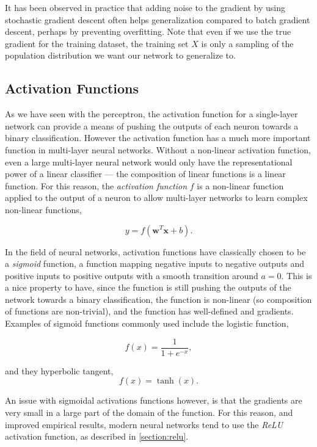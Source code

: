 \documentclass[thesis]{subfiles}
\begin{document}
It has been observed in practice that adding noise to the gradient by using stochastic gradient descent often helps generalization compared to batch gradient descent, perhaps by preventing overfitting. Note that even if we use the true gradient for the training dataset, the training set $X$ is only a sampling of the population distribution we want our network to generalize to.

\subsection{Activation Functions}
As we have seen with the perceptron, the activation function for a single-layer network can provide a means of pushing the outputs of each neuron towards a binary classification. However the activation function has a much more important function in multi-layer neural networks. Without a non-linear activation function, even a large multi-layer neural network would only have the representational power of a linear classifier --- the composition of linear functions is a linear function. For this reason, the \emph{activation function} $f$ is a non-linear function applied to the output of a neuron to allow multi-layer networks to learn complex non-linear functions,

\begin{equation}
y = f\left(\mathbf{w}^T\mathbf{x} + b\right).
\end{equation}

In the field of neural networks, activation functions have classically chosen to be a \emph{sigmoid} function, \ie{}a function mapping negative inputs to negative outputs and positive inputs to positive outputs with a smooth transition around $a = 0$. This is a nice property to have, since the function is still pushing the outputs of the network towards a binary classification, the function is non-linear (so composition of functions are non-trivial), and the function has well-defined and gradients. Examples of sigmoid functions commonly used include the logistic function, 

\begin{equation}
	f(x) = \frac{1}{1+e^{-x}},
\end{equation}

and they hyperbolic tangent,
\begin{equation}
	f(x) = \tanh(x).
\end{equation}

An issue with sigmoidal activations functions however, is that the gradients are very small in a large part of the domain of the function. For this reason, and improved empirical results, modern neural networks tend to use the \emph{ReLU} activation function, as described in \cref{section:relu}.
\end{document}
